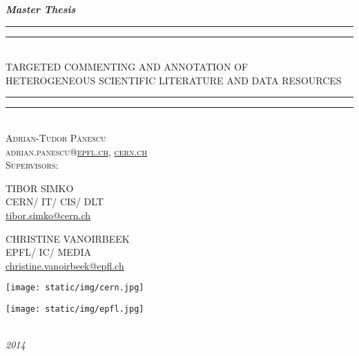 
\begin{titlepage}
  \centering
  \vspace*{5\baselineskip}
  \textbf{\textit{Master Thesis}}
  \\\vspace*{\baselineskip}
  \rule{\textwidth}{1.6pt}\vspace*{-\baselineskip}\vspace*{2pt}
  \rule{\textwidth}{0.4pt}\\[\baselineskip]
  {TARGETED COMMENTING AND ANNOTATION OF\\[0.3\baselineskip] HETEROGENEOUS SCIENTIFIC LITERATURE AND DATA RESOURCES}
  \rule{\textwidth}{0.4pt}\vspace*{-\baselineskip}\vspace{3.2pt}
  \rule{\textwidth}{1.6pt}\\[\baselineskip]
  \scshape
  \vspace*{2\baselineskip}
  Adrian-Tudor P\u{a}nescu\\
  adrian.panescu@\href{mailto:adrian.panescu@epfl.ch}{epfl.ch},
                 \href{mailto:adrian.panescu@cern.ch}{cern.ch}
  \\\vspace*{4\baselineskip}
  Supervisors:
  \\\vspace*{1\baselineskip}
  \begin{minipage}{0.4\textwidth}
    \centering
    TIBOR SIMKO\\
    CERN/ IT/ CIS/ DLT\\
    \href{mailto:tibor.simko@cern.ch}{tibor.simko@cern.ch}
  \end{minipage}
  \begin{minipage}{0.4\textwidth}
    \centering
    CHRISTINE VANOIRBEEK\\
    EPFL/ IC/ MEDIA\\
    \href{mailto:christine.vanoirbeek@epfl.ch}{christine.vanoirbeek@epfl.ch}
  \end{minipage}
  \vfill
  \begin{minipage}{0.4\textwidth}
    \centering
    \texttt{[image: static/img/cern.jpg]}
  \end{minipage}
  \begin{minipage}{0.4\textwidth}
    \centering
    \texttt{[image: static/img/epfl.jpg]}
  \end{minipage}
  \\\vspace*{1\baselineskip}
  \textit{2014}
\end{titlepage}
